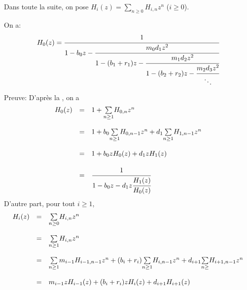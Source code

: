 Dans toute la suite, on pose $H_{i}(z) = \underset{n\geq 0}{\sum}H_{i, n}z^{n}$ ($i\geq 0$).
\begin{proposition}\label{H-frac} On a:
	\[
		\begin{array}{r c l}
			H_{0}(z)=\cfrac{1}{1-b_{0}z-\cfrac{m_{0}d_{1}z^2}{1-(b_{1}+r_{1})z-\cfrac{m_{1}d_{2}z^2}
			{1-(b_{2}+r_{2})z-\cfrac{m_{2}d_{3}z^2}{\ddots}}}}
		\end{array}
	\]
\end{proposition}
Preuve:
D'après la , on a
$$
	\begin{array}{r c l}
		H_{0}(z) & =       & 1+\underset{n\geq1}{\sum}H_{0,n}z^n                                                 \\
		         & \text{}                                                                                       \\
		         & =       & 1+b_{0}\underset{n\geq1}{\sum}H_{0,n-1}z^n+d_{1}\underset{n\geq1}{\sum}H_{1,n-1}z^n \\
		         & \text{}                                                                                       \\
		         & =       & 1+b_{0}zH_{0}(z)+d_{1}zH_{1}(z)                                                     \\
		         & \text{}                                                                                       \\
		         & =       & \cfrac{1}{1-b_{0}z-d_{1}z\cfrac{H_{1}(z)}{H_{0}(z)}}
	\end{array}
$$
D'autre part, pour tout $i\geq1$,
\[
	\begin{array}{r c l}
		H_{i}(z) & =       & \underset{n\geq0}{\sum}H_{i,n}z^n                                                                     \\
		         & \text{} &                                                                                                       \\
		         & =       & \underset{n\geq1}{\sum}H_{i,n}z^n                                                                     \\
		         & \text{} &                                                                                                       \\
		         & =       & \underset{n\geq1}{\sum}m_{i-1}H_{i-1,n-1}z^n+(b_{i}+r_{i})\underset{n\geq1}{\sum}H_{i,n-1}z^n+d_{i+1}
		\underset{n\geq}{\sum}H_{i+1,n-1}z^n                                                                                       \\
		         & \text{} &                                                                                                       \\
		         & =       & m_{i-1}zH_{i-1}(z)+(b_{i}+r_{i})zH_{i}(z)+d_{i+1}H_{i+1}(z)
	\end{array}
\]
